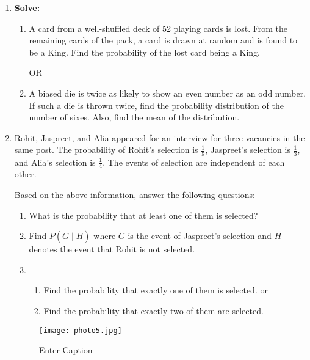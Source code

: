 \documentclass{article}
\begin{document}
\begin{enumerate}[label=\textbf{\arabic*.}]
\begin{enumerate}[label=\textbf{\arabic*.}]
    \item \textbf{Solve:}
    
    \begin{enumerate}[label=\alph*)] %
        \item A card from a well-shuffled deck of 52 playing cards is lost. From the remaining cards of the pack, a card is drawn at random and is found to be a King. Find the probability of the lost card being a King.
        
         \begin{center}
        OR
        \end{center}
        
        \item A biased die is twice as likely to show an even number as an odd number. If such a die is thrown twice, find the probability distribution of the number of sixes. Also, find the mean of the distribution.
    \end{enumerate}

    \item Rohit, Jaspreet, and Alia appeared for an interview for three vacancies in the same post. The probability of Rohit's selection is \(\frac{1}{5}\), Jaspreet's selection is \(\frac{1}{3}\), and Alia's selection is \(\frac{1}{4}\). The events of selection are independent of each other.

    Based on the above information, answer the following questions:
    \begin{enumerate}[label=\roman*)] %
        \item What is the probability that at least one of them is selected?
        
        \item Find \(P(G \mid \bar{H})\) where \(G\) is the event of Jaspreet's selection and \(\bar{H}\) denotes the event that Rohit is not selected.
        
        \item \begin{enumerate}[label=\roman*)] %
            \item Find the probability that exactly one of them is selected.
                        or
            \item Find the probability that exactly two of them are selected.
        \end{enumerate}
    \end{enumerate}


    \begin{figure}
    \centering
    \texttt{[image: photo5.jpg]}
    \caption{Enter Caption}
    \label{fig:enter-label}
\end{figure}


\end{enumerate}

\end{enumerate}
\end{document}
